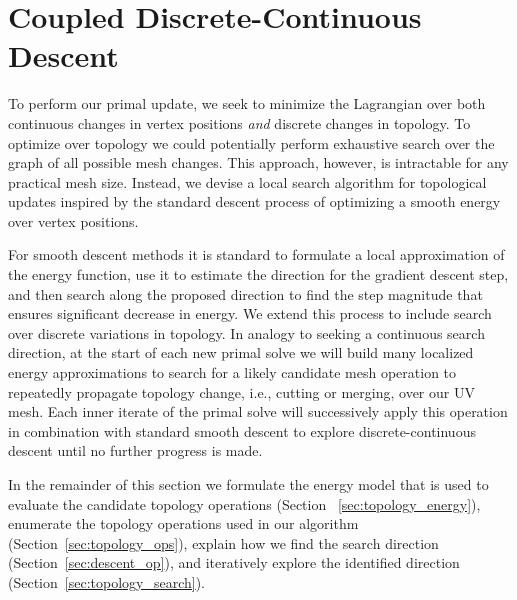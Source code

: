 
\section{Coupled Discrete-Continuous Descent}
\label{sec:topologySearch}
To perform our primal update, we seek to minimize the Lagrangian over both continuous changes in vertex positions \emph{and} discrete changes in topology. 
%
To optimize over topology we could potentially perform exhaustive search over the graph of all possible mesh changes. This approach, however, is intractable for any practical mesh size. 
%
Instead, we devise a local search algorithm for topological updates inspired by the standard descent process of optimizing a smooth energy over vertex positions. 

%
For smooth descent methods it is standard to formulate a local approximation of the energy function, use it to estimate the direction for the gradient descent step, and then search along the proposed direction to find the step magnitude that ensures significant decrease in energy. 
%
We extend this process to include search over discrete variations in topology. In analogy to seeking a continuous search direction, at the start of each new primal solve we will build many localized energy approximations to search for a likely candidate mesh operation to repeatedly propagate topology change, i.e., cutting or merging, over our UV mesh. Each inner iterate of the primal solve will successively apply this operation in combination with standard smooth descent to explore discrete-continuous descent until no further progress is made.%

In the remainder of this section we formulate the energy model that is used to evaluate the candidate topology operations (Section ~\ref{sec:topology_energy}), 
enumerate the topology operations used in our algorithm (Section~\ref{sec:topology_ops}), explain how we find the search direction (Section~\ref{sec:descent_op}), and iteratively explore the identified direction (Section~\ref{sec:topology_search}).

